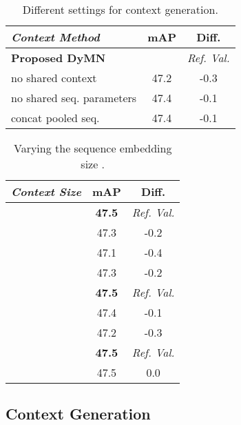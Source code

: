 \documentclass[lettersize,journal]{IEEEtran}
\begin{document}
\begin{table}[t!]

\centering
\begin{minipage}[t]{\columnwidth}
\caption{Different settings for context generation.}
\label{tab:abl_cgm}


\centering
\begin{tabular}{@{}lcc@{}}
\toprule
\textit{Context Method} & \textbf{mAP} & \textbf{Diff.}  \\ \midrule
\textbf{Proposed DyMN} &  & \textit{Ref. Val.} \\
\midrule
no shared context & 47.2 & -0.3 \\ 
no shared seq. parameters & 47.4 & -0.1 \\ 
concat pooled seq. & 47.4 & -0.1 \\ 
 \bottomrule
\end{tabular}
\end{minipage}

\end{table}

\begin{table}[t!]

\centering
\begin{minipage}[t]{\columnwidth}
\caption{Varying the sequence embedding size .}
\label{tab:abl_seq_size}


\centering
\begin{tabular}{@{}lcc@{}}
\toprule
\textit{Context Size} & \textbf{mAP} & \textbf{Diff.}  \\ \midrule
 & \textbf{47.5} & \textit{Ref. Val.}  \\ 
 & 47.3 & -0.2  \\
 & 47.1 & -0.4  \\ \midrule
 & 47.3 & -0.2 \\ 
 & \textbf{47.5} & \textit{Ref. Val.} \\ 
 & 47.4 & -0.1 \\ \midrule
 & 47.2 & -0.3 \\ 
 & \textbf{47.5} & \textit{Ref. Val.} \\ 
 & 47.5 &  0.0 \\
 \bottomrule
\end{tabular}
\end{minipage}

\end{table}

\subsection{Context Generation}
\label{subsec:abl_cgm}
\end{document}
